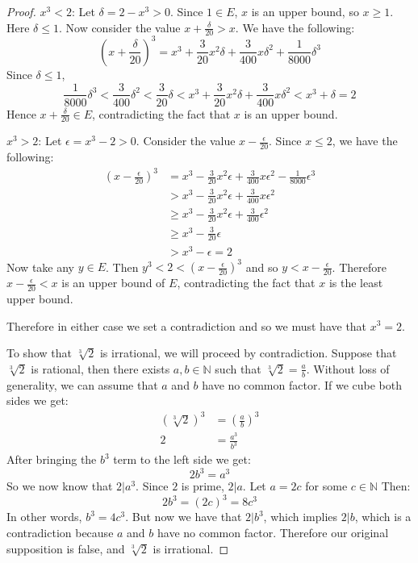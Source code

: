 \documentclass[12pt]{amsart}
\begin{document}
\begin{enumerate}
\begin{proof}
\bigskip

$x^3 < 2$: Let $\delta = 2-x^3 > 0$. Since $1\in E$, $x$ is an upper bound, so $x\ge 1$. Here $\delta \le 1$. Now consider the value $x+\frac{\delta}{20} > x$. We have the following:
\[
\left(x+\frac{\delta}{20}\right)^3 = 
x^3 + \frac{3}{20} x^2 \delta + \frac{3}{400}x \delta^2 + \frac{1}{8000}\delta^3
\]
Since $\delta \le 1$,
\[ \frac{1}{8000}\delta^3 < \frac 3 {400} \delta^2 < \frac 3 {20} \delta < x^3 + \frac{3}{20} x^2 \delta + \frac{3}{400}x \delta^2 < x^3 + \delta = 2\]
Hence $x+\frac{\delta}{20}\in E$, contradicting the fact that $x$ is an upper bound.

\bigskip

$x^3 > 2$: Let $\epsilon = x^3-2 > 0$. Consider the value $x-\frac{\epsilon}{20}$. Since $x\le 2$, we have the following:
\begin{align*}
\left(x-\frac{\epsilon}{20}\right)^3 &= 
x^3 - \frac{3}{20} x^2 \epsilon + \frac{3}{400}x \epsilon^2 - \frac{1}{8000}\epsilon^3 \\
&> x^3 - \frac{3}{20} x^2 \epsilon + \frac{3}{400}x \epsilon^2 \\
&\ge x^3 - \frac{3}{20} x^2 \epsilon + \frac{3}{400} \epsilon^2 \\
&\ge x^3 - \frac{3}{20} \epsilon \\
&> x^3 - \epsilon = 2
\end{align*}
Now take any $y\in E$. Then $y^3<2<\left(x-\frac{\epsilon}{20}\right)^3$ and so $y<x-\frac{\epsilon}{20}$. Therefore $x-\frac{\epsilon}{20}<x$ is an upper bound of $E$, contradicting the fact that $x$ is the least upper bound.

Therefore in either case we set a contradiction and so we must have that $x^3=2$.

\bigskip

To show that $\sqrt[3] 2$ is irrational, we will proceed by contradiction. Suppose that $\sqrt[3] 2$ is rational, then there exists $a,b \in\mathbb N$ such that $\sqrt[3] 2 = \frac{a}{b}$. Without loss of generality, we can assume that $a$ and $b$ have no common factor. If we cube both sides we get:
\begin{align*}
\left(\sqrt[3] 2\right)^3 &= \left(\frac{a}{b}\right)^3 \\
2 &= \frac{a^3}{b^3}
\end{align*}
After bringing the $b^3$ term to the left side we get:
\[ 2 b^3 = a^3 \]
So we now know that $2|a^3$. Since $2$ is prime, $2|a$. Let $a=2c$ for some $c\in\mathbb N$ Then:
\[ 2b^3 = (2c)^3 = 8c^3 \]
In other words, $b^3 = 4c^3$. But now we have that $2|b^3$, which implies $2|b$, which is a contradiction because $a$ and $b$ have no common factor. Therefore our original supposition is false, and $\sqrt[3] 2$ is irrational.
\end{proof}


\end{enumerate}
\end{document}
